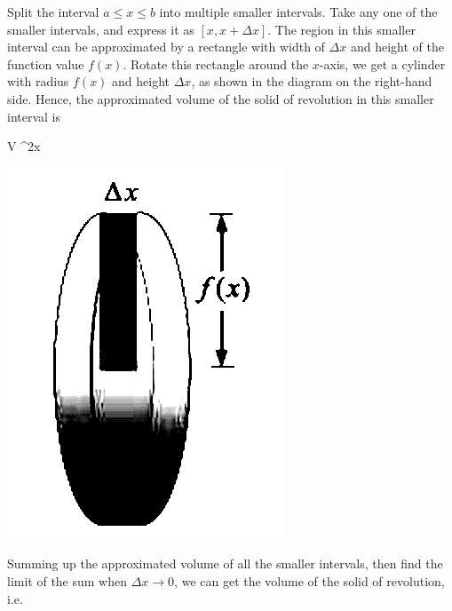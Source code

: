     \vspace{0.5cm}
    \begin{vwcol}[widths={0.7,0.3},justify=flush,rule=0pt,indent=1em]

        Split the interval $a \leq x \leq b$ into multiple smaller intervals. Take any
        one of the smaller intervals, and express it as $[x, x + \Delta x]$. The region
        in this smaller interval can be approximated by a rectangle with width of
        $\Delta x$ and height of the function value $f(x)$. Rotate this rectangle
        around the $x$-axis, we get a cylinder with radius $f(x)$ and height $\Delta
            x$, as shown in the diagram on the right-hand side. Hence, the approximated
        volume of the solid of revolution in this smaller interval is
        \begin{cequation}
            \Delta V \approx \pi[f(x)]^2\Delta x
        \end{cequation}

        \includegraphics[scale=0.3]{assets/28-22b.png}
    \end{vwcol}
    \vspace{0.5cm}
    Summing up the approximated volume of all the smaller intervals, then find the
    limit of the sum when $\Delta x \to 0$, we can get the volume of the solid of
    revolution, i.e.
    \begin{center}
    \end{center}
